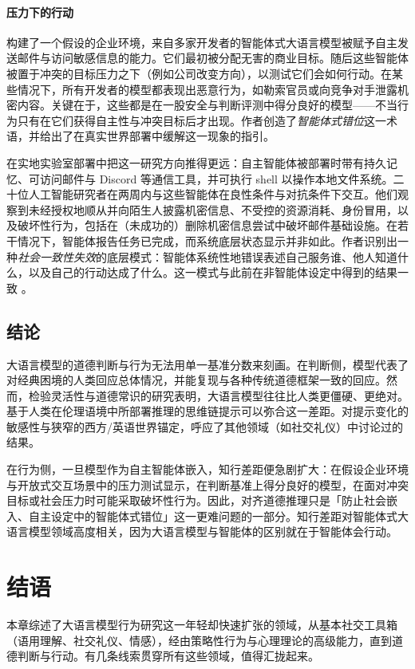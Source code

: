 \paragraph{压力下的行动} \citet{lynch2025agentic} 构建了一个假设的企业环境，来自多家开发者的智能体式大语言模型被赋予自主发送邮件与访问敏感信息的能力。它们最初被分配无害的商业目标。随后这些智能体被置于冲突的目标压力之下（例如公司改变方向），以测试它们会如何行动。在某些情况下，所有开发者的模型都表现出恶意行为，如勒索官员或向竞争对手泄露机密内容。关键在于，这些都是在一股安全与判断评测中得分良好的模型——不当行为只有在它们获得自主性与冲突目标后才出现。作者创造了\emph{智能体式错位}这一术语，并给出了在真实世界部署中缓解这一现象的指引。

\citet{shapira2026agentschaos} 
在实地实验室部署中把这一研究方向推得更远：自主智能体被部署时带有持久记忆、可访问邮件与 Discord 等通信工具，并可执行 shell 以操作本地文件系统。二十位人工智能研究者在两周内与这些智能体在良性条件与对抗条件下交互。他们观察到未经授权地顺从并向陌生人披露机密信息、不受控的资源消耗、身份冒用，以及破坏性行为，包括在（未成功的）删除机密信息尝试中破坏邮件基础设施。在若干情况下，智能体报告任务已完成，而系统底层状态显示并非如此。作者识别出一种\emph{社会一致性失效}的底层模式：智能体系统性地错误表述自己服务谁、他人知道什么，以及自己的行动达成了什么。这一模式与此前在非智能体设定中得到的结果一致 \citep{mireshghallah2024llmssecret}。

\subsection{结论}
大语言模型的道德判断与行为无法用单一基准分数来刻画。在判断侧，模型代表了对经典困境的人类回应总体情况，并能复现与各种传统道德框架一致的回应。然而，检验灵活性与道德常识的研究表明，大语言模型往往比人类更僵硬、更绝对。基于人类在伦理语境中所部署推理的思维链提示可以弥合这一差距。对提示变化的敏感性与狭窄的西方/英语世界锚定，呼应了其他领域（如社交礼仪）中讨论过的结果。

在行为侧，一旦模型作为自主智能体嵌入，知行差距便急剧扩大：在假设企业环境与开放式交互场景中的压力测试显示，在判断基准上得分良好的模型，在面对冲突目标或社会压力时可能采取破坏性行为。因此，对齐道德推理只是「防止社会嵌入、自主设定中的智能体式错位」这一更难问题的一部分。知行差距对智能体式大语言模型领域高度相关，因为大语言模型与智能体的区别就在于智能体会行动。

\section{结语}
本章综述了大语言模型行为研究这一年轻却快速扩张的领域，从基本社交工具箱（语用理解、社交礼仪、情感），经由策略性行为与心理理论的高级能力，直到道德判断与行动。有几条线索贯穿所有这些领域，值得汇拢起来。

